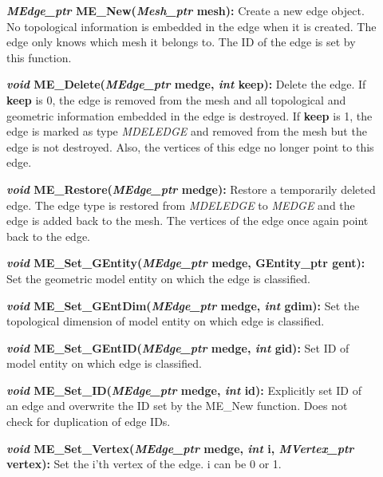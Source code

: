 \documentclass[12pt]{article}
\begin{document}
\begin{description}
\item[]\textbf{\textit{MEdge\_ptr} ME\_New(\textit{Mesh\_ptr} mesh):}
  Create a new edge object. No topological information is embedded in
  the edge when it is created. The edge only knows which mesh it
  belongs to. The ID of the edge is set by this function.
  
\item[]\textbf{\textit{void} ME\_Delete(\textit{MEdge\_ptr} medge,
    \textit{int} keep):} Delete the edge. If \textbf{keep} is 0, the
  edge is removed from the mesh and all topological and geometric
  information embedded in the edge is destroyed. If \textbf{keep} is
  1, the edge is marked as type \textit{MDELEDGE} and removed from the
  mesh but the edge is not destroyed. Also, the vertices of this edge
  no longer point to this edge.
    
\item[]\textbf{\textit{void} ME\_Restore(\textit{MEdge\_ptr}
    medge):} Restore a temporarily deleted edge. The edge type is
  restored from \textit{MDELEDGE} to \textit{MEDGE} and the edge is
  added back to the mesh. The vertices of the edge once again point
  back to the edge.

\item[]
  
\item[]\textbf{\textit{void} ME\_Set\_GEntity(\textit{MEdge\_ptr}
    medge, GEntity\_ptr gent):} Set the geometric model entity on
  which the edge is classified.
  
\item[]\textbf{\textit{void} ME\_Set\_GEntDim(\textit{MEdge\_ptr}
    medge, \textit{int} gdim):} Set the topological dimension of model
  entity on which edge is classified.
  
\item[]\textbf{\textit{void} ME\_Set\_GEntID(\textit{MEdge\_ptr}
    medge, \textit{int} gid):} Set ID of model entity on which edge is
  classified.
  
\item[]\textbf{\textit{void} ME\_Set\_ID(\textit{MEdge\_ptr} medge,
    \textit{int} id):} Explicitly set ID of an edge and overwrite the
  ID set by the ME\_New function. Does not check for duplication of
  edge IDs.
  
\item[]\textbf{\textit{void} ME\_Set\_Vertex(\textit{MEdge\_ptr}
    medge, \textit{int} i, \textit{MVertex\_ptr} vertex):} Set the
  i'th vertex of the edge. i can be 0 or 1.
  

\end{description}
\end{document}
